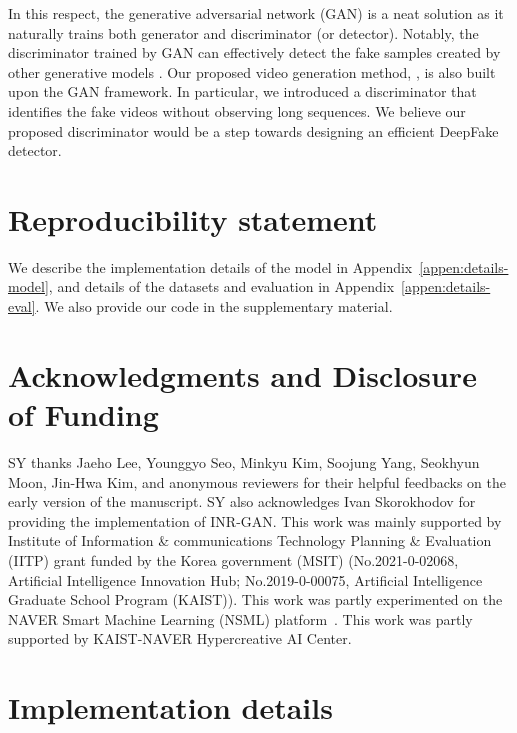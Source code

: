 \documentclass{article} \usepackage{iclr2022_conference,times}
\begin{document}
In this respect, the generative adversarial network (GAN) is a neat solution as it naturally trains both generator and discriminator (or detector). Notably, the discriminator trained by GAN can effectively detect the fake samples created by other generative models \citep{wang2020cnn}. Our proposed video generation method, \sname, is also built upon the GAN framework. In particular, we introduced a discriminator that identifies the fake videos without observing long sequences. We believe our proposed discriminator would be a step towards designing an efficient DeepFake detector.

\section*{Reproducibility statement}

We describe the implementation details of the model in Appendix~\ref{appen:details-model}, and details of the datasets and evaluation in Appendix~\ref{appen:details-eval}. We also provide our code in the supplementary material.

\section*{Acknowledgments and Disclosure of Funding}
SY thanks Jaeho Lee, Younggyo Seo, Minkyu Kim, Soojung Yang, Seokhyun Moon, Jin-Hwa Kim, and anonymous reviewers for their helpful feedbacks on the early version of the manuscript. SY also acknowledges Ivan Skorokhodov for providing the implementation of INR-GAN. This work was mainly supported by Institute of Information \& communications Technology Planning \& Evaluation (IITP) grant funded by the Korea government (MSIT) (No.2021-0-02068, Artificial Intelligence Innovation Hub; No.2019-0-00075, Artificial Intelligence Graduate School Program (KAIST)). This work was partly experimented on the NAVER Smart Machine Learning (NSML) platform~\citep{nsml,kim2018nsml}. This work was partly supported by KAIST-NAVER Hypercreative AI Center.




\appendix

\clearpage
\section{Implementation details}
\label{appen:details}
\end{document}
